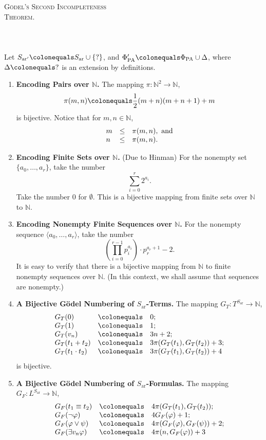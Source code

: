 \documentclass[leqno]{report}
\newcommand{\nat}{\mathbb{N}}
\newcommand{\ar}{\mathrm{ar}}
\newcommand{\pa}{\mathrm{PA}}
\newcommand{\are}{{\mathrm{ar}^\prime}}
\begin{document}
\noindent
\textsc{\huge G\"{o}del's Second Incompleteness \hfill\\Theorem.}\\
\\
\\
\\
Let $S_\are \colonequals S_\ar \cup \{ ? \}$, and $\Phi_\pa^\prime \colonequals \Phi_\pa \cup \Delta$, where $\Delta \colonequals ?$ is an extension by definitions.
\begin{enumerate}[1.]
\item \textbf{Encoding Pairs over $\nat$.} The mapping $\pi : \nat^2 \to \nat$,
\[
\pi (m, n) \colonequals \frac{1}{2}(m + n)(m + n + 1) + m
\]
is bijective. Notice that for $m, n \in \nat$,
\[
\begin{array}{lll}
m & \leq & \pi (m, n), \mbox{ and}\cr
n & \leq & \pi (m, n).
\end{array}
\]
%
\item \textbf{Encoding Finite Sets over $\nat$.} (Due to Hinman) For the nonempty set $\{ a_0, \ldots, a_r \}$, take the number
\[
\sum^r_{i = 0} 2^{a_i}.
\]
Take the number $0$ for $\emptyset$. This is a bijective mapping from finite sets over $\nat$ to $\nat$.
%
\item \textbf{Encoding Nonempty Finite Sequences over $\nat$.} For the nonempty sequence $\langle a_0, \ldots, a_r \rangle$, take the number
\[
\left(\prod_{i = 0}^{r - 1} p_i^{a_i}\right) \cdot p_r^{a_r + 1} - 2.
\]
It is easy to verify that there is a bijective mapping from $\nat$ to finite nonempty sequences over $\nat$. (In this context, we shall assume that sequences are nonempty.)
%
\item \textbf{A Bijective G\"{o}del Numbering of $S_\ar$-Terms.} The mapping $G_T : T^{S_\ar} \to \nat$,
\[
\begin{array}{lll}
G_T(0) & \colonequals & 0;\cr
G_T(1) & \colonequals & 1;\cr
G_T(v_n) & \colonequals & 3n + 2;\cr
G_T(t_1 + t_2) & \colonequals & 3\pi (G_T(t_1), G_T(t_2)) + 3;\cr
G_T(t_1 \cdot t_2) & \colonequals & 3\pi (G_T(t_1), G_T(t_2)) + 4
\end{array}
\]
is bijective.
%
\item \textbf{A Bijective G\"{o}del Numbering of $S_\ar$-Formulas.} The mapping $G_F : L^{S_\ar} \to \nat$,
\[
\begin{array}{lll}
G_F(t_1 \equiv t_2) & \colonequals & 4\pi (G_T(t_1), G_T(t_2));\cr
G_F(\neg\varphi ) & \colonequals & 4G_F(\varphi ) + 1;\cr
G_F(\varphi\lor\psi ) & \colonequals & 4\pi (G_F(\varphi ), G_F(\psi )) + 2;\cr
G_F(\exists v_n \varphi ) & \colonequals & 4\pi (n, G_F(\varphi )) + 3

\end{array}\]
\end{enumerate}
\end{document}
